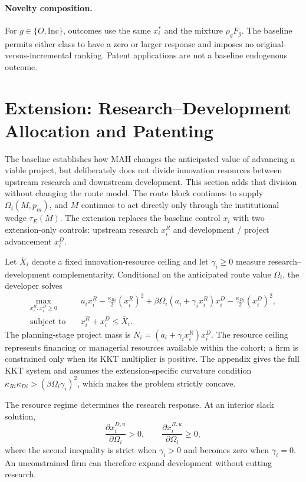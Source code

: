\documentclass[12pt]{article}
\newcommand{\1}{\mathbf{1}}
\begin{document}
\paragraph{Novelty composition.}
For \(g\in\{O,\mathrm{Inc}\}\), outcomes use the same \(x_i^*\) and the
mixture \(\rho_gF_g\). The baseline permits either class to have a zero or
larger response and imposes no original-versus-incremental ranking. Patent
applications are not a baseline endogenous outcome.

\section{Extension: Research--Development Allocation and Patenting}
\label{sec:main-rd-extension}

The baseline establishes how MAH changes the anticipated value of advancing
a viable project, but deliberately does not divide innovation resources
between upstream research and downstream development. This section adds that
division without changing the route model. The route block continues to
supply \(\Omega_i(M,p_m)\), and \(M\) continues to act directly only through
the institutional wedge \(\tau_E(M)\). The extension replaces the baseline
control \(x_i\) with two extension-only controls: upstream research
\(x_i^R\) and development / project advancement \(x_i^D\).

Let \(\bar X_i\) denote a fixed innovation-resource ceiling and let
\(\gamma_i\geq0\) measure research--development complementarity. Conditional
on the anticipated route value \(\Omega_i\), the developer solves
\begin{equation}
  \begin{aligned}
  \max_{x_i^R,x_i^D\geq0}\quad
  &u_i x_i^R-\frac{\kappa_{Ri}}2(x_i^R)^2
  +\beta\Omega_i(a_i+\gamma_i x_i^R)x_i^D
  -\frac{\kappa_{Di}}2(x_i^D)^2,\\
  \text{subject to}\quad&x_i^R+x_i^D\leq\bar X_i.
  \end{aligned}
  \label{eq:main-rd-objective}
\end{equation}
The planning-stage project mass is
\(N_i=(a_i+\gamma_i x_i^R)x_i^D\). The resource ceiling represents financing
or managerial resources available within the cohort; a firm is constrained
only when its KKT multiplier is positive. The appendix gives the full KKT
system and assumes the extension-specific curvature condition
\(\kappa_{Ri}\kappa_{Di}>(\beta\Omega_i\gamma_i)^2\), which makes the problem
strictly concave.

The resource regime determines the research response. At an interior slack
solution,
\begin{equation}
  \frac{\partial x_i^{D,u}}{\partial\Omega_i}>0,
  \qquad
  \frac{\partial x_i^{R,u}}{\partial\Omega_i}\geq0,
  \label{eq:main-rd-slack-signs}
\end{equation}
where the second inequality is strict when \(\gamma_i>0\) and becomes zero
when \(\gamma_i=0\). An unconstrained firm can therefore expand development
without cutting research.
\end{document}
